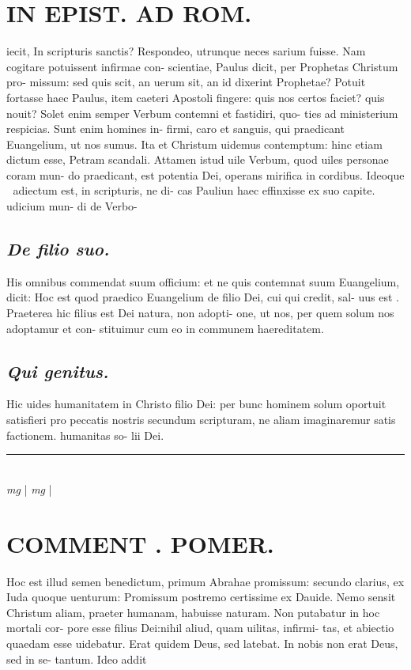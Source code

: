 \documentclass{article}
\begin{document}
\begin{pages}
\section*{IN EPIST. AD ROM.  }
\marginpar{[ p.5 ]}\pstart iecit, In scripturis sanctis? Respondeo, utrunque neces sarium fuisse. Nam cogitare potuissent infirmae con- scientiae, Paulus dicit, per Prophetas Christum pro- missum: sed quis scit, an uerum sit, an id dixerint Prophetae? Potuit fortasse haec Paulus, item caeteri Apostoli fingere: quis nos certos faciet? quis nouit? Solet enim semper Verbum contemni et fastidiri, quo- ties ad ministerium respicias. Sunt enim homines in- firmi, caro et sanguis, qui praedicant Euangelium, ut nos sumus. Ita et Christum uidemus contemptum: hinc etiam dictum esse, Petram scandali. Attamen istud uile Verbum, quod uiles personae coram mun- do praedicant, est potentia Dei, operans mirifica in cordibus. Ideoque  adiectum est, in scripturis, ne di- cas Pauliun haec effinxisse ex suo capite.  udicium mun- di de Verbo-  \pend
{}
{}
\subsection*{\textit{De filio suo. }}\pstart His omnibus commendat suum officium: et ne quis contemnat suum Euangelium, dicit: Hoc est quod praedico Euangelium de filio Dei, cui qui credit, sal- uus est . Praeterea hic filius est Dei natura, non adopti- one, ut nos, per quem solum nos adoptamur et con- stituimur cum eo in communem haereditatem.   \pend
{}
{}
\subsection*{\textit{Qui genitus. }}\pstart Hic uides humanitatem in Christo filio Dei: per bunc hominem solum oportuit satisfieri pro peccatis nostris secundum scripturam, ne aliam imaginaremur satis factionem.  humanitas so- lii Dei.  \pend
\vspace{0.5cm}\noindent
\vspace{0.2cm}\rule{1cm}{0.2pt}\\ 
\hspace{0.2cm}\textit{mg}
\footnotesize 
\normalsize| 
\hspace{0.2cm}\textit{mg}
\footnotesize 
\normalsize| 
\section*{COMMENT . POMER.  }\pstart Hoc est illud semen benedictum, primum Abrahae promissum: secundo clarius, ex Iuda quoque uenturum: Promissum postremo certissime ex Dauide.  \pend\pstart Nemo sensit Christum aliam, praeter humanam, habuisse naturam. Non putabatur in hoc mortali cor- pore esse filius Dei:nihil aliud, quam uilitas, infirmi- tas, et abiectio quaedam esse uidebatur. Erat quidem Deus, sed latebat. In nobis non erat Deus, sed in se- tantum. Ideo addit  \pend
{}
{}

\end{pages}
\end{document}
